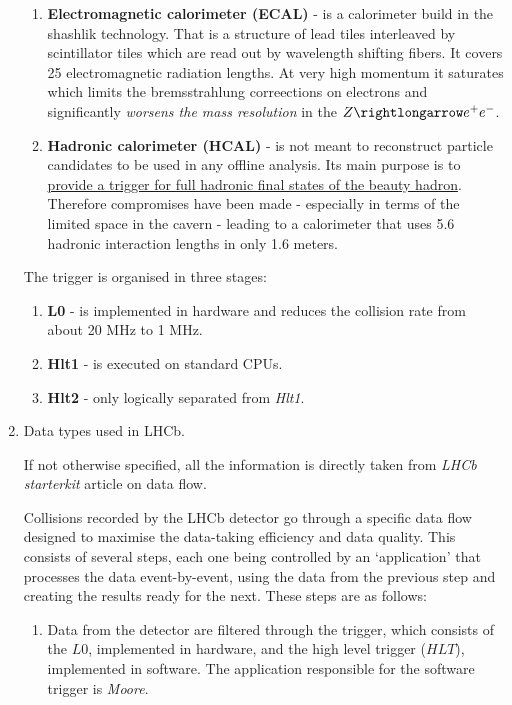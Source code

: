 \documentclass[11pt,a4paper,twoside]{article}
\begin{document}
\begin{enumerate}
\begin{enumerate}
            \item \textbf{Electromagnetic calorimeter (ECAL)} - is a calorimeter build in the shashlik technology. That is a structure of lead tiles interleaved by scintillator tiles which are read out by wavelength shifting fibers. It covers 25 electromagnetic radiation lengths. At very high momentum it saturates which limits the bremsstrahlung correections on electrons and significantly \textit{worsens the mass resolution} in the $Z \rightlongarrow e^{+} e^{-}$.
            
            \item \textbf{Hadronic calorimeter (HCAL)} - is not meant to reconstruct particle candidates to be used in any offline analysis. Its main purpose is to \underline{provide a trigger for full hadronic final states of the beauty hadron}. Therefore compromises have been made - especially in terms of the limited space in the cavern - leading to a calorimeter that uses 5.6 hadronic interaction lengths in only 1.6 meters.
        \end{enumerate}

        The trigger is organised in three stages:
        \begin{enumerate}
            \item \textbf{L0} - is implemented in hardware and reduces the collision rate from about 20 MHz to 1 MHz.
            \item \textbf{Hlt1} - is executed on standard CPUs.
            \item \textbf{Hlt2} - only logically separated from \textit{Hlt1}. 
        \end{enumerate}


        \item Data types used in LHCb.

        If not otherwise specified, all the information is directly taken from \textit{LHCb starterkit} article on data flow.\cite{LHCb-STARTERKIT-DATAFLOW}

        Collisions recorded by the LHCb detector go through a specific data flow designed to maximise the data-taking efficiency and data quality. This consists of several steps, each one being controlled by an ‘application’ that processes the data event-by-event, using the data from the previous step and creating the results ready for the next. These steps are as follows:

        \begin{enumerate}
            \item Data from the detector are filtered through the trigger, which consists of the $L0$, implemented in hardware, and the high level trigger ($HLT$), implemented in software. The application responsible for the software trigger is \textit{Moore}.


\end{enumerate}
\end{enumerate}
\end{document}
